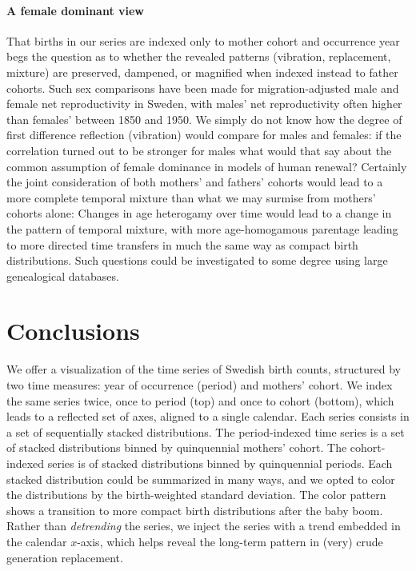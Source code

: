 \documentclass{article}
\begin{document}
\paragraph{A female dominant view}
That births in our series are indexed only to mother cohort and occurrence year begs the question as to whether the revealed patterns (vibration, replacement, mixture) are preserved, dampened, or magnified when indexed instead to father cohorts. Such sex comparisons have been made for migration-adjusted male and female net reproductivity \citep{hyrenius1951reproduction} in Sweden, with males' net reproductivity often higher than females' between 1850 and 1950. We simply do not know how the degree of first difference reflection (vibration) would compare for males and females: if the correlation turned out to be stronger for males what would that say about the common assumption of female dominance in models of human renewal? Certainly the joint consideration of both mothers' and fathers' cohorts would lead to a more complete temporal mixture than what we may surmise from mothers' cohorts alone: Changes in age heterogamy over time would lead to a change in the pattern of temporal mixture, with more age-homogamous parentage leading to more directed time transfers in much the same way as compact birth distributions. Such questions could be investigated to some degree using large genealogical databases.

\section{Conclusions}
\label{sec:conc}
We offer a visualization of the time series of Swedish birth counts, structured by two time measures: year of occurrence (period) and mothers' cohort. We index the same series twice, once to period (top) and once to cohort (bottom), which leads to a reflected set of axes, aligned to a single calendar. Each series consists in a set of sequentially stacked distributions. The period-indexed time series is a set of stacked distributions binned by quinquennial mothers' cohort. The cohort-indexed series is of stacked distributions binned by quinquennial periods. Each stacked distribution could be summarized in many ways, and we opted to color the distributions by the birth-weighted standard deviation. The color pattern shows a transition to more compact birth distributions after the baby boom. Rather than \emph{detrending} the series, we inject the series with a trend embedded in the calendar $x$-axis, which helps reveal the long-term pattern in (very) crude generation replacement.
\end{document}
